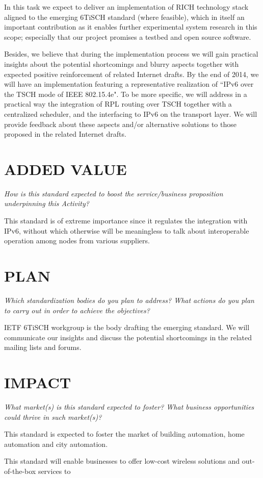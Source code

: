 \documentclass[]{article}
\begin{document}
In this task we expect to deliver an implementation of RICH technology stack aligned to the emerging 6TiSCH standard (where feasible), which in itself an important contribution as it enables further experimental system research in this scope; especially that our project promises a testbed and open source software.

Besides, we believe that during the implementation process we will gain practical insights about the potential shortcomings and blurry aspects together with expected positive reinforcement of related Internet drafts. 
By the end of 2014, we will have an implementation featuring a representative realization of “IPv6 over the TSCH mode of IEEE 802.15.4e". 
To be more specific, we will address in a practical way the integration of RPL routing over TSCH together with a centralized scheduler, and the interfacing to IPv6 on the transport layer. 
We will provide feedback about these aspects and/or alternative solutions to those proposed in the related Internet drafts.

\section{ADDED VALUE}

\emph{How is this standard expected to boost the service/business proposition underpinning this Activity?}

This standard is of extreme importance since it regulates the integration with IPv6, without which otherwise will be meaningless to talk about interoperable operation among nodes from various suppliers.

\section{PLAN}

\emph{Which standardization bodies do you plan to address? What actions do you plan to carry out in order to achieve the objectives?}

IETF 6TiSCH workgroup is the body drafting the emerging standard. 
We will communicate our insights and discuss the potential shortcomings in the related mailing lists and forums.

\section{IMPACT}

\emph{What market(s) is this standard expected to foster? What business opportunities could thrive in such market(s)?}

This standard is expected to foster the market of building automation, home automation and city automation. 

This standard will enable businesses to offer low-cost wireless solutions and out-of-the-box services to 
\end{document}
